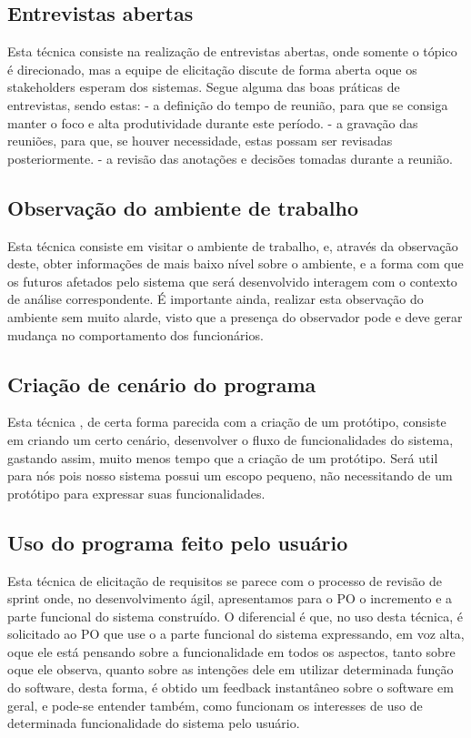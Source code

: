   \subsection{Entrevistas abertas}
  Esta técnica consiste na realização de entrevistas abertas, onde somente o tópico é direcionado, mas a equipe de elicitação
  discute de forma aberta oque os stakeholders esperam dos sistemas. Segue alguma das boas práticas de entrevistas, sendo estas:
  - a definição do tempo de reunião, para que se consiga manter o foco
  e alta produtividade durante este período.
   - a gravação das reuniões, para que, se houver necessidade, estas possam ser revisadas posteriormente.
  - a revisão das anotações e decisões tomadas durante a reunião.
  
  \subsection{Observação do ambiente de trabalho}
  Esta técnica consiste em visitar o ambiente de trabalho, e, através da observação deste, obter informações de
  mais baixo nível sobre o ambiente, e a forma com que os futuros afetados pelo sistema que será desenvolvido interagem
  com o contexto de análise correspondente. É importante ainda, realizar esta observação do ambiente sem muito alarde,
  visto que a presença do observador pode e deve gerar mudança no comportamento dos funcionários.
  
  \subsection{Criação de cenário do programa}
  Esta técnica , de certa forma parecida com  a criação de um protótipo, consiste em criando um certo cenário,
  desenvolver o fluxo de funcionalidades do sistema, gastando assim, muito menos tempo que a criação de um protótipo.
  Será util para nós pois nosso sistema possui um escopo pequeno, não necessitando de um protótipo para expressar 
  suas funcionalidades.
  
  \subsection{Uso do programa feito pelo usuário}
  Esta técnica de elicitação de requisitos se parece com o processo de revisão de sprint
  onde, no desenvolvimento ágil, apresentamos para o PO o incremento e a parte funcional do sistema construído.
  O diferencial é que, no uso desta técnica, é solicitado ao PO que use o a parte funcional do sistema expressando, 
  em voz alta, oque ele está pensando sobre a funcionalidade em todos os aspectos, tanto sobre oque ele observa, quanto
  sobre as intenções dele em utilizar determinada função do software, desta forma, é obtido um feedback
  instantâneo sobre o software em geral, e pode-se entender também, 
  como funcionam os interesses de uso de determinada funcionalidade
  do sistema pelo usuário.
